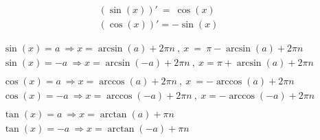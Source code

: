 \documentclass{article}
\begin{document}
\[
\begin{array}{l}
    (\sin( x)) \prime \ =\ \cos( x)\\
    (\cos( x)) \prime =-\sin( x)
\end{array}
\]

\[
\begin{array}{l}
    \sin( x) =a\ \Rightarrow x=\arcsin( a) +2\pi n\ ,\ x\ =\ \pi -\arcsin( a) +2\pi n\\
    \sin( x) =-a\ \Rightarrow x=\arcsin( -a) +2\pi n\ ,\ x=\pi +\arcsin( a) +2\pi n\\
    \\
    \cos( x) =a\ \Rightarrow x=\arccos( a) +2\pi n\ ,\ x\ =-\arccos( a) +2\pi n\\
    \cos( x) =-a\ \Rightarrow x=\arccos( -a) +2\pi n\ ,\ x=-\arccos( -a) +2\pi n\\
    \\
    \tan( x) =a\ \Rightarrow x=\arctan( a) +\pi n\ \\
    \tan( x) =-a\ \Rightarrow x=\arctan( -a) +\pi n
\end{array}
\]

\newpage
\end{document}
